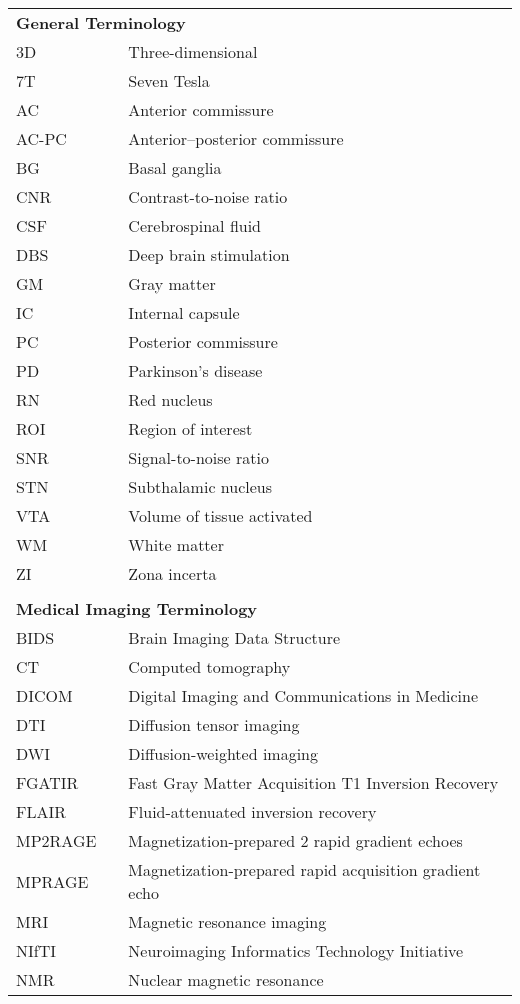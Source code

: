 \documentclass[hidelinks,12pt,oneside]{report}
\numberwithin{figure}{chapter}
\newenvironment{preliminary}%
{\pagestyle{plain}\pagenumbering{roman}}%
{\pagenumbering{arabic}}
\begin{document}
\begin{preliminary}
\begin{longtable}{lcl}
\multicolumn{3}{l}{\textbf{General Terminology}} \\
3D & & Three-dimensional \\
7T & & Seven Tesla \\
AC & & Anterior commissure \\
AC-PC & & Anterior–posterior commissure \\
BG & & Basal ganglia \\
CNR & & Contrast-to-noise ratio \\
CSF & & Cerebrospinal fluid \\
DBS & & Deep brain stimulation \\
GM & & Gray matter \\
IC & & Internal capsule \\
PC & & Posterior commissure \\
PD & & Parkinson’s disease \\
RN & & Red nucleus \\
ROI & & Region of interest \\
SNR & & Signal-to-noise ratio \\
STN & & Subthalamic nucleus \\
VTA & & Volume of tissue activated \\
WM & & White matter \\
ZI & & Zona incerta \\
\\
\multicolumn{3}{l}{\textbf{Medical Imaging Terminology}} \\
BIDS & & Brain Imaging Data Structure \\
CT & & Computed tomography \\
DICOM & & Digital Imaging and Communications in Medicine \\
DTI & & Diffusion tensor imaging \\
DWI & & Diffusion-weighted imaging \\
FGATIR & & Fast Gray Matter Acquisition T1 Inversion Recovery \\
FLAIR & & Fluid-attenuated inversion recovery \\
MP2RAGE & & Magnetization-prepared 2 rapid gradient echoes \\
MPRAGE & & Magnetization-prepared rapid acquisition gradient echo \\
MRI & & Magnetic resonance imaging \\
NIfTI & & Neuroimaging Informatics Technology Initiative \\
NMR & & Nuclear magnetic resonance \\

\end{longtable}
\end{preliminary}
\end{document}
